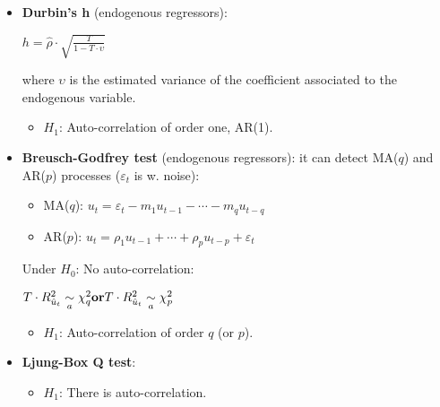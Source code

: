 \documentclass[10pt, a4paper, landscape]{extarticle}
\begin{document}
\begin{multicols}{3}
\begin{itemize}[leftmargin=*]
\begin{itemize}[leftmargin=*]
\begin{center}
		\end{center}
		\item \textbf{Durbin's h} (endogenous regressors):
		\begin{center}
			$h = \hat{\rho} \cdot \sqrt{\frac{T}{1 - T \cdot \upsilon}}$
		\end{center}
		where $\upsilon$ is the estimated variance of the coefficient associated to the endogenous variable.
		\begin{itemize}[leftmargin=*]
			\item $H_1$: Auto-correlation of order one, AR(1).
		\end{itemize}
		\item \textbf{Breusch-Godfrey test} (endogenous regressors): it can detect MA($q$) and AR($p$) processes ($\varepsilon_t$ is w. noise):
		\begin{itemize}[leftmargin=*]
			\item MA($q$): $u_t = \varepsilon_t - m_1 u_{t - 1} - \cdots - m_q u_{t - q}$
			\item AR($p$): $u_t = \rho_1 u_{t - 1} + \cdots + \rho_p u_{t - p} + \varepsilon_t$
		\end{itemize}
		Under $H_0$: No auto-correlation:
		\begin{center}
			$\hfill T \cdot R^2_{\hat{u}_t} \underset{a}{\sim} \chi^2_q \hfill \textbf{or} \hfill T \cdot R^2_{\hat{u}_t} \underset{a}{\sim} \chi^2_p \hfill$
		\end{center}
		\begin{itemize}[leftmargin=*]
			\item $H_1$: Auto-correlation of order $q$ (or $p$).
		\end{itemize}
		\item \textbf{Ljung-Box Q test}:
		\begin{itemize}[leftmargin=*]
			\item $H_1$: There is auto-correlation.
		\end{itemize}
	\end{itemize}


\end{itemize}
\end{multicols}
\end{document}
